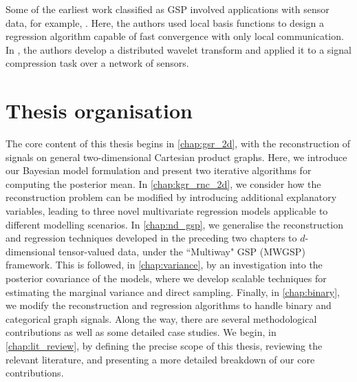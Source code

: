 Some of the earliest work classified as GSP involved applications with sensor data, for example, \cite{Guestrin2004}. Here, the authors used local basis functions to design a regression algorithm capable of fast convergence with only local communication. In \cite{Wagner2005}, the authors develop a distributed wavelet transform and applied it to a signal compression task over a network of sensors. 

\section{Thesis organisation}

The core content of this thesis begins in \cref{chap:gsr_2d}, with the reconstruction of signals on general two-dimensional Cartesian product graphs. Here, we introduce our Bayesian model formulation and present two iterative algorithms for computing the posterior mean. In \cref{chap:kgr_rnc_2d}, we consider how the reconstruction problem can be modified by introducing additional explanatory variables, leading to three novel multivariate regression models applicable to different modelling scenarios. In \cref{chap:nd_gsp}, we generalise the reconstruction and regression techniques developed in the preceding two chapters to $d$-dimensional tensor-valued data, under the ``Multiway" GSP (MWGSP) framework. This is followed, in \cref{chap:variance}, by an investigation into the posterior covariance of the models, where we develop scalable techniques for estimating the marginal variance and direct sampling. Finally, in \cref{chap:binary}, we modify the reconstruction and regression algorithms to handle binary and categorical graph signals. Along the way, there are several methodological contributions as well as some detailed case studies. We begin, in \cref{chap:lit_review}, by defining the precise scope of this thesis, reviewing the relevant literature, and presenting a more detailed breakdown of our core contributions. 
